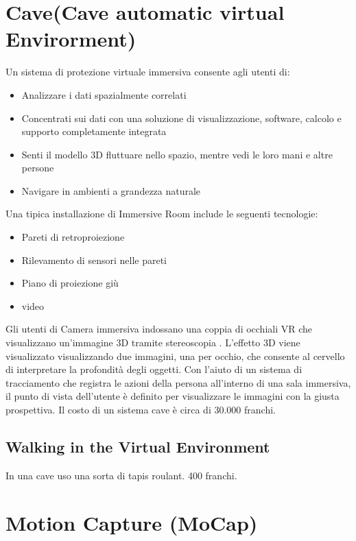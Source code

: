 \documentclass[8pt]{extarticle}
\begin{document}
\begin{multicols}{3}
\section{Cave(Cave automatic virtual Envirorment)}
Un sistema di protezione virtuale immersiva consente agli utenti di:
\begin{itemize}
    \item Analizzare i dati spazialmente correlati
    \item Concentrati sui dati con una soluzione di visualizzazione, software, calcolo e supporto completamente integrata
    \item Senti il modello 3D fluttuare nello spazio, mentre vedi le loro mani e altre persone
    \item Navigare in ambienti a grandezza naturale 
\end{itemize}
Una tipica installazione di Immersive Room include le seguenti tecnologie:
\begin{itemize}
    \item Pareti di retroproiezione
    \item Rilevamento di sensori nelle pareti
    \item Piano di proiezione giù
    \item video 
\end{itemize}
Gli utenti di Camera immersiva indossano una coppia di occhiali VR che visualizzano un'immagine 3D tramite stereoscopia . L'effetto 3D viene visualizzato visualizzando due immagini, una per occhio, che consente al cervello di interpretare la profondità degli oggetti. Con l'aiuto di un sistema di tracciamento che registra le azioni della persona all'interno di una sala immersiva, il punto di vista dell'utente è definito per visualizzare le immagini con la giusta prospettiva. 
Il costo di un sistema cave è circa di 30.000 franchi.
\subsection{Walking in the Virtual Environment}
In una cave uso una sorta di tapis roulant. 400 franchi.

\section{Motion Capture (MoCap)}

\end{multicols}
\end{document}
